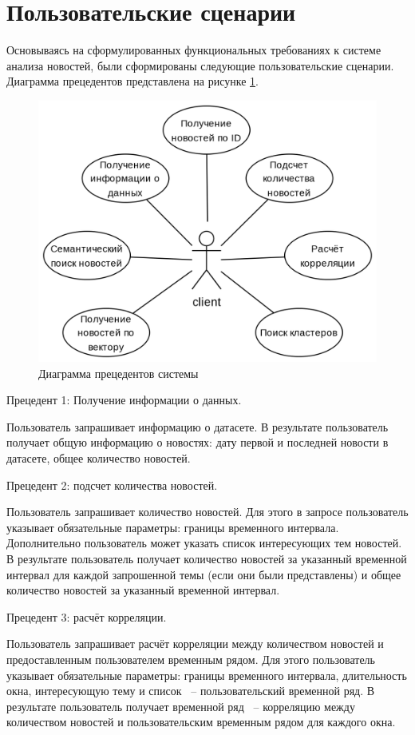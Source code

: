 \section{Пользовательские сценарии}
\label{chap:precedents}
Основываясь на сформулированных функциональных требованиях к системе анализа новостей, были сформированы следующие пользовательские сценарии. Диаграмма прецедентов представлена на рисунке \ref{img:use-case-diagram}.

\begin{figure}[h]
    \centering
    \includegraphics[width=0.7\linewidth]{images/use-case-diagram.png}
    \caption{Диаграмма прецедентов системы}
    \label{img:use-case-diagram}
\end{figure}

Прецедент 1: Получение информации о данных.

Пользователь запрашивает информацию о датасете. В результате пользователь получает общую информацию о новостях: дату первой и последней новости в датасете, общее количество новостей.

Прецедент 2: подсчет количества новостей.

Пользователь запрашивает количество новостей. Для этого в запросе пользователь указывает обязательные параметры: границы временного интервала. Дополнительно пользователь может указать список интересующих тем новостей. В результате пользователь получает количество новостей за указанный временной интервал для каждой запрошенной темы (если они были представлены) и общее количество новостей за указанный временной интервал.

Прецедент 3: расчёт корреляции.

Пользователь запрашивает расчёт корреляции между количеством новостей и предоставленным пользователем временным рядом. Для этого пользователь указывает обязательные параметры: границы временного интервала, длительность окна, интересующую тему и список ~-- пользовательский временной ряд. В результате пользователь получает временной ряд ~-- корреляцию между количеством новостей и пользовательским временным рядом для каждого окна.

